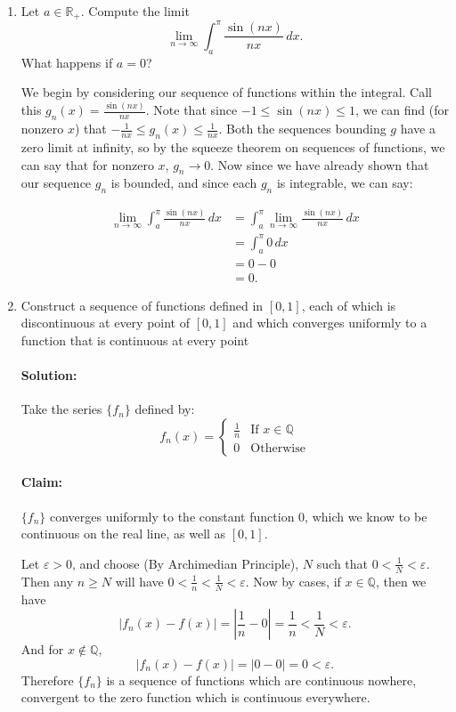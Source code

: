 \documentclass{article}
\begin{document}
\begin{enumerate}
\item Let $a\in \mathbb{R}_{+}$. Compute the limit
  \[
  \lim_{n \to \infty} \int_{a}^{\pi} \frac{\sin(nx)}{nx} \, d x 
  .\] 
  What happens if $a=0$?

  We begin by considering our sequence of functions within the integral. Call this
  $g_n(x) =\frac{\sin(nx)}{nx}$. Note that since $-1\leq\sin(nx)\leq 1$, we can find (for nonzero $x$) that $-\frac{1}{nx}\leq g_n(x)\leq \frac{1}{nx}$. Both the sequences bounding $g$ have a zero limit at infinity, so by the squeeze theorem on sequences of functions, we can say that for nonzero $x$, $g_n\to 0$.
  Now since we have already shown that our sequence $g_n$ is bounded, and since each $g_n$ is integrable, we can say:

  \begin{align*}
  \lim_{n \to \infty} \int_{a}^{\pi} \frac{\sin(nx)}{nx} \, d x 
  &=\int_{a}^{\pi} \lim_{n \to \infty} \frac{\sin(nx)}{nx} \, d x \\
  &=\int_{a}^{\pi} 0 \, d x \\
  &= 0-0 \\
  &= 0
  .\end{align*}

\item Construct a sequence of functions defined in $[0,1]$, each of which is discontinuous at every point of $[0,1]$ and which converges uniformly to a function that is continuous at every point 

  \paragraph{Solution: }Take the series $\{f_n\} $ defined by:
  \[
    f_n(x)=\begin{cases}
      \frac{1}{n}&\text{If } x\in \mathbb{Q}\\
      0&\text{Otherwise}
    \end{cases}
  \] 
  \paragraph{Claim:}  $\{f_n\} $ converges uniformly to the constant function $0$, which we know to be continuous on the real line, as well as $[0,1]$. 

  Let $\varepsilon>0$, and choose (By Archimedian Principle), $N$ such that $0<\frac{1}{N}<\varepsilon$.
  Then any $n\geq N$ will have $0<\frac{1}{n}<\frac{1}{N}<\varepsilon$. Now by cases, if $x\in \mathbb{Q}$, then we have 
  \[
  |f_n(x)-f(x)|=\left|\frac{1}{n}-0\right|=\frac{1}{n}<\frac{1}{N}<\varepsilon
  .\] 
  And for $x\not\in \mathbb{Q}$, 
\[
  |f_n(x)-f(x)|=\left|0-0\right|=0<\varepsilon
.\] 
  Therefore $\{f_n\} $ is a sequence of functions which are continuous nowhere, convergent to the zero function which is continuous everywhere. 


\end{enumerate}
\end{document}
